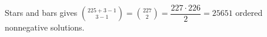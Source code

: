 Stars and bars gives $\binom{225+3-1}{3-1}=\binom{227}2=\dfrac{227\cdot226}{2}=\boxed{25651}$ ordered nonnegative solutions.
